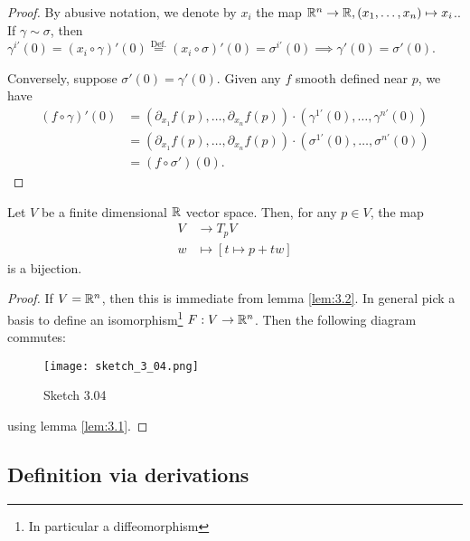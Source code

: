 \begin{proof}
    By abusive notation, we denote by \(x_i\) the map \(\mathbb{R}^n\to\mathbb{R}, (x_1,\dots,x_n)\mapsto x_i\)..
    If \(\gamma\sim\sigma\), then \(\gamma^{i'}(0)=(x_i\circ \gamma)'(0)\stackrel{\text{Def.}}{=}(x_i\circ\sigma)'(0)=\sigma^{i'}(0)\implies \gamma'(0)=\sigma'(0)\).

    Conversely, suppose \(\sigma'(0)=\gamma'(0)\). Given any \(f\) smooth defined near \(p\), we have 
    \begin{align*}
        (f\circ \gamma)'(0)&=(\partial_{x_1} f(p),\dots,\partial_{x_n} f(p) )\cdot (\gamma^{1'}(0),\dots,\gamma^{n'}(0))\\
        &=(\partial_{x_1} f(p),\dots,\partial_{x_n} f(p) )\cdot (\sigma^{1'}(0),\dots,\sigma^{n'}(0)) \\
        &=(f\circ \sigma')(0).
    \end{align*}
\end{proof}


\begin{corollary}\label{cor:3.3}
    Let \(V\) be a finite dimensional \(\mathbb{R}\) vector space. Then, for any \(p\in V\), the  map 
    \begin{align*}
        V&\to T_p V\\
        w&\mapsto [t\mapsto p + tw]
    \end{align*}
    is a bijection.
\end{corollary}

\begin{proof}
If \(V=\mathbb{R}^n\), then this is immediate from lemma \ref{lem:3.2}. In general pick a basis 
to define an isomorphism\footnote{In particular a diffeomorphism} \(F:V\to\mathbb{R}^n\). Then the following diagram commutes:
\begin{figure}[H]
    \centering
    \texttt{[image: sketch\_3\_04.png]}
    \caption{Sketch 3.04}
\end{figure}    
using lemma \ref{lem:3.1}.
\end{proof}

\subsection{Definition via derivations}


